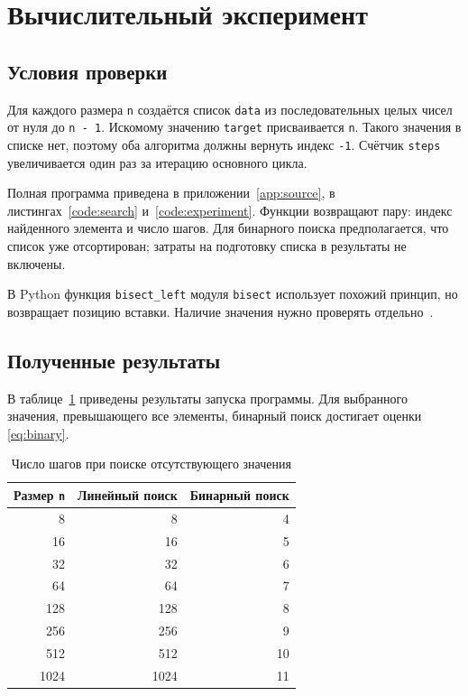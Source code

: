 \section{Вычислительный эксперимент}
\subsection{Условия проверки}
Для каждого размера \texttt{n} создаётся список \texttt{data}
из последовательных целых чисел от нуля до \texttt{n - 1}.
Искомому значению \texttt{target} присваивается \texttt{n}.
Такого значения в списке нет, поэтому оба алгоритма должны вернуть
индекс \texttt{-1}. Счётчик \texttt{steps} увеличивается один раз
за итерацию основного цикла.

Полная программа приведена в приложении~\ref{app:source},
в листингах~\ref{code:search} и~\ref{code:experiment}.
Функции возвращают пару: индекс найденного элемента и число шагов.
Для бинарного поиска предполагается, что список уже отсортирован;
затраты на подготовку списка в результаты не включены.

В Python функция \texttt{bisect\_left} модуля \texttt{bisect} использует
похожий принцип, но возвращает позицию вставки. Наличие значения нужно
проверять отдельно~\cite{python}.

\subsection{Полученные результаты}
В таблице~\ref{tab:results} приведены результаты запуска программы.
Для выбранного значения, превышающего все элементы, бинарный поиск
достигает оценки \eqref{eq:binary}.
\begin{table}[H]
\centering
\caption{Число шагов при поиске отсутствующего значения}
\label{tab:results}
\begin{tabular}{|r|r|r|}
\hline
Размер \texttt{n} & Линейный поиск & Бинарный поиск \\
\hline
8 & 8 & 4 \\
16 & 16 & 5 \\
32 & 32 & 6 \\
64 & 64 & 7 \\
128 & 128 & 8 \\
256 & 256 & 9 \\
512 & 512 & 10 \\
1024 & 1024 & 11 \\
\hline
\end{tabular}
\end{table}

